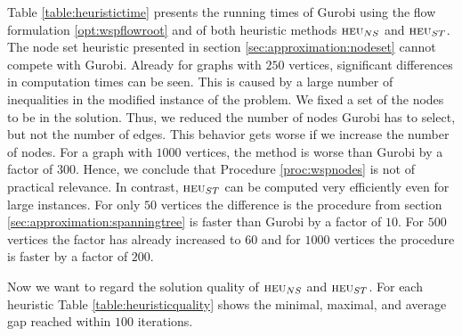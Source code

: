 Table \ref{table:heuristictime} presents the running times of Gurobi using the flow formulation \eqref{opt:wspflowroot} and of both heuristic methods $\textsc{heu}_{NS}$ and $\textsc{heu}_{ST}$. The node set heuristic presented in section \ref{sec:approximation:nodeset} cannot compete with Gurobi. Already for graphs with $250$ vertices, significant differences in computation times can be seen. This is caused by a large number of inequalities in the modified instance of the problem. We fixed a set of the nodes to be in the solution. Thus, we reduced the number of nodes Gurobi has to select, but not the number of edges. This behavior gets worse if we increase the number of nodes. For a graph with $1000$ vertices, the method is worse than Gurobi by a factor of $300$. Hence, we conclude that Procedure \ref{proc:wspnodes} is not of practical relevance. In contrast, $\textsc{heu}_{ST}$ can be computed very efficiently even for large instances. For only $50$ vertices the difference is the procedure from section \ref{sec:approximation:spanningtree} is faster than Gurobi by a factor of $10$. For $500$ vertices the factor has already increased to $60$ and for $1000$ vertices the procedure is faster by a factor of $200$.\medskip

Now we want to regard the solution quality of $\textsc{heu}_{NS}$ and $\textsc{heu}_{ST}$. For each heuristic Table \ref{table:heuristicquality} shows the minimal, maximal, and average gap reached within $100$ iterations.

